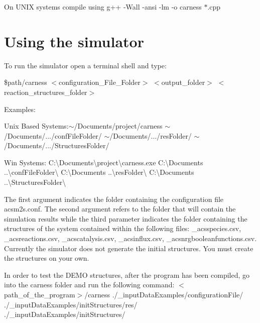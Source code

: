 On U\-N\-I\-X systems compile using {\ttfamily g++} -\/\-Wall -\/ansi -\/lm -\/o carness $\ast$.cpp \par
\par
 \hypertarget{a00001_secUsage}{}\section{Using the simulator}\label{a00001_secUsage}
To run the simulator open a terminal shell and type\-:\par
\par
 {\ttfamily } \$path/carness {\ttfamily } $<$configuration\-\_\-\-File\-\_\-\-Folder$>$ {\ttfamily } $<$output\-\_\-folder$>$ {\ttfamily } $<$reaction\-\_\-structures\-\_\-folder$>$\par
 Examples\-:
\begin{DoxyItemize}
\item Unix Based Systems\-:{\ttfamily $\sim$/\-Documents/project/carness} {\ttfamily $\sim$/\-Documents/}.../conf\-File\-Folder/ {\ttfamily $\sim$/\-Documents/}.../res\-Folder/ {\ttfamily $\sim$/\-Documents/}.../\-Structures\-Folder/
\item Win Systems\-: {\ttfamily C\-:\textbackslash{}Documents\textbackslash{}project\textbackslash{}carness.\-exe} {\ttfamily C\-:\textbackslash{}Documents} ..\textbackslash{}conf\-File\-Folder\textbackslash{} {\ttfamily C\-:\textbackslash{}Documents} ..\textbackslash{}res\-Folder\textbackslash{} {\ttfamily C\-:\textbackslash{}Documents} ..\textbackslash{}Structures\-Folder\textbackslash{}
\end{DoxyItemize}

The first argument indicates the folder containing the configuration file acsm2s.\-conf. The second argument refers to the folder that will contain the simulation results while the third parameter indicates the folder containing the structures of the system contained within the following files\-: \-\_\-acsspecies.\-csv, \-\_\-acsreactions.\-csv, \-\_\-acscatalysis.\-csv, \-\_\-acsinflux.\-csv, \-\_\-acsnrgbooleanfunctions.\-csv. Currently the simulator does not generate the initial structures. You must create the structures on your own.

In order to test the D\-E\-M\-O structures, after the program has been compiled, go into the carness folder and run the following command\-: {\ttfamily } $<$path\-\_\-of\-\_\-the\-\_\-program$>$/carness {\ttfamily }./\-\_\-input\-Data\-Examples/configuration\-File/ {\ttfamily }./\-\_\-input\-Data\-Examples/init\-Structures/res/ {\ttfamily }./\-\_\-input\-Data\-Examples/init\-Structures/

